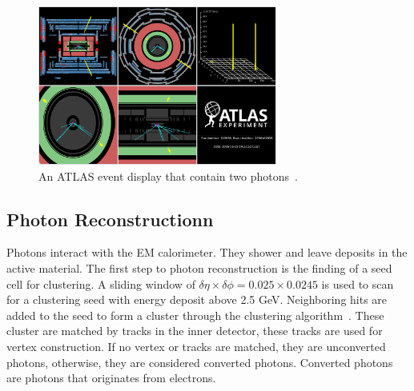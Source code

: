 \begin{figure}[!htb]
    \begin{center}
        \includegraphics[width=0.7\textwidth]{figures/common_ana/photonEvent}
        \caption{        
        An ATLAS event display that contain two photons~\cite{atlastwophoton}.
        }
        \label{fig:photonEvent}
    \end{center}
\end{figure}

\subsection{Photon Reconstructionn}
Photons interact with the EM calorimeter. They shower and leave deposits in the active material. The first step to photon reconstruction is the finding of a seed cell for clustering. A sliding window of $\delta \eta \times \delta \phi = 0.025 \times 0.0245$ is used to scan for a clustering seed with energy deposit above 2.5 GeV. Neighboring hits are added to the seed to form a cluster through the clustering algorithm~\cite{Lampl:1099735}. 
These cluster are matched by tracks in the inner detector, these tracks are used for vertex construction. If no vertex or tracks are matched, they are unconverted photons, otherwise, they are considered converted photons. Converted photons are photons that originates from electrons. 


